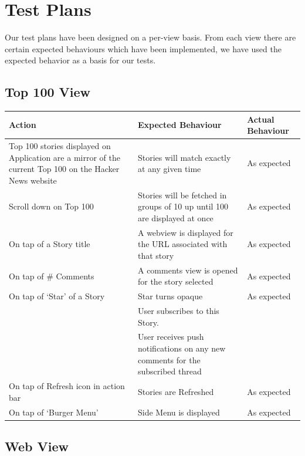 \documentclass[11pt]{article}
\begin{document}
\section*{Test Plans}

Our test plans have been designed on a per-view basis. From each view there are certain expected behaviours which have been implemented, we have used the expected behavior as a basis for our tests.

\subsection*{Top 100 View}

\begin{center}
    \begin{tabular}{ | p{5cm} | p{5cm} | p{5cm} |}
    \hline
    \textbf{Action} & \textbf{Expected Behaviour} & \textbf{Actual Behaviour} \\
    \hline
    Top 100 stories displayed on Application are a mirror of the current Top 100 on the Hacker News website & Stories will match exactly at any given time & As expected   \\ 	\hline
    Scroll down on Top 100 & Stories will be fetched in groups of 10 up until 100 are displayed at once & As expected \\ 
    \hline
    On tap of a Story title & A webview is displayed for the URL associated with that story & As expected \\
    \hline
	On tap of \# Comments & A comments view is opened for the story selected & As expected \\
	\hline
	On tap of ‘Star' of a Story & Star turns opaque & As expected \\ & User subscribes to this Story. & \\ & User receives push notifications on any new comments for the subscribed thread & \\
	\hline
	On tap of Refresh icon in action bar & Stories are Refreshed & As expected \\
	\hline
	On tap of ‘Burger Menu' & Side Menu is displayed & As expected \\
	\hline
    \end{tabular}
\end{center}

\subsection*{Web View}
\end{document}
